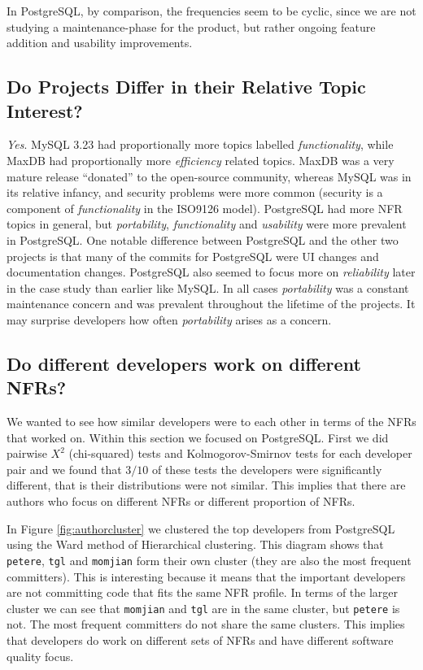 \documentclass[smallextended]{svjour3}       %
\begin{document}
In PostgreSQL, by comparison, the frequencies seem to be cyclic, since we are not studying a maintenance-phase for the product, but rather ongoing
feature addition and usability improvements.

\subsection{Do Projects Differ in their Relative  Topic Interest?}
\emph{Yes}. MySQL 3.23 had proportionally more
topics labelled \emph{functionality}, while MaxDB had proportionally more
\emph{efficiency} related topics. MaxDB was a very mature release ``donated'' to the open-source community, 
whereas MySQL was in its relative infancy, and	
security problems were more common (security is a component of \emph{functionality} in the ISO9126 model). 
PostgreSQL had more NFR topics in general, but \emph{portability},
\emph{functionality} and \emph{usability} were more prevalent in
PostgreSQL. One notable difference between PostgreSQL and the other
two projects is that many of the commits for PostgreSQL were UI
changes and documentation changes. PostgreSQL also seemed to focus
more on \emph{reliability} later in the case study than earlier like MySQL.
In all cases \emph{portability} was a constant maintenance concern and was prevalent throughout the lifetime of the projects. It may surprise developers
how often \emph{portability} arises as a concern.



\subsection{Do different developers work on different NFRs?}

\label{sec:developers}


We wanted to see how similar developers were to each other in terms of
the NFRs that worked on. 
Within this section we focused on PostgreSQL.
First we did pairwise $X^2$ (chi-squared)
tests and Kolmogorov-Smirnov tests for each developer pair and we
found that $3/10$ of these tests the developers were significantly
different, that is their distributions were not similar. This implies
that there are authors who focus on different NFRs or different
proportion of NFRs.

In Figure \ref{fig:authorcluster} we clustered the top developers from
PostgreSQL using the
Ward method of Hierarchical clustering.  This diagram shows that
\texttt{petere}, \texttt{tgl} and \texttt{momjian} form their own
cluster (they are also the most frequent committers). This is
interesting because it means that the important developers are not
committing code that fits the same NFR profile. In terms of the larger
cluster we can see that \texttt{momjian} and \texttt{tgl} are in the
same cluster, but \texttt{petere} is not. The most frequent
committers do not share the same clusters. This implies that
developers do work on different sets of NFRs and have different
software quality focus.
\end{document}

